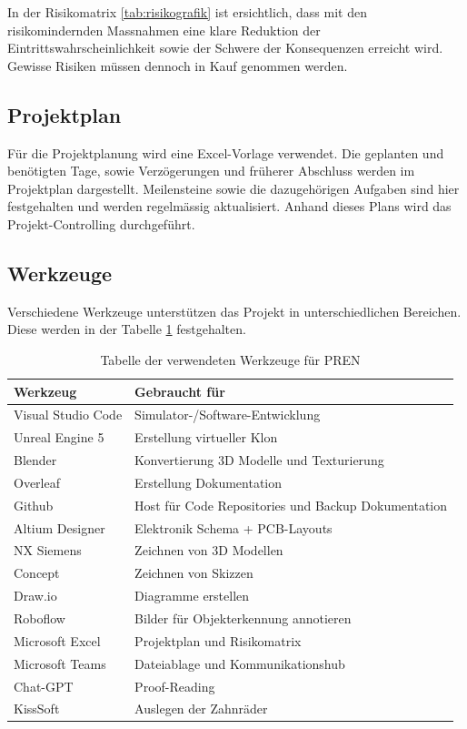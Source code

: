 \documentclass[../main.tex]{subfiles}
\begin{document}
In der Risikomatrix \ref{tab:risikografik} ist ersichtlich, dass mit den risikomindernden Massnahmen eine klare Reduktion der Eintrittswahrscheinlichkeit sowie der Schwere der Konsequenzen erreicht wird. Gewisse Risiken müssen dennoch in Kauf genommen werden.

\subsection{Projektplan}
Für die Projektplanung wird eine Excel-Vorlage verwendet. Die geplanten und benötigten Tage, sowie Verzögerungen und früherer Abschluss werden im Projektplan dargestellt. Meilensteine sowie die dazugehörigen Aufgaben sind hier festgehalten und werden regelmässig aktualisiert. Anhand dieses Plans wird das Projekt-Controlling durchgeführt.


\subsection{Werkzeuge}

Verschiedene Werkzeuge unterstützen das Projekt in unterschiedlichen Bereichen. Diese werden in der Tabelle \ref{tab:werkzeugtabelle} festgehalten.

\begin{table}[H]
\centering
\begin{tabular}{|l|l|}
\hline
\textbf{Werkzeug} & \textbf{Gebraucht für} \\ \hline
Visual Studio Code & Simulator-/Software-Entwicklung \\ \hline
Unreal Engine 5 & Erstellung virtueller Klon \\ \hline
Blender & Konvertierung 3D Modelle und Texturierung \\ \hline
Overleaf & Erstellung Dokumentation \\ \hline
Github & Host für Code Repositories und Backup Dokumentation \\ \hline
Altium Designer & Elektronik Schema + PCB-Layouts \\ \hline
NX Siemens & Zeichnen von 3D Modellen \\ \hline
Concept & Zeichnen von Skizzen \\ \hline
Draw.io & Diagramme erstellen \\ \hline
Roboflow & Bilder für Objekterkennung annotieren \\ \hline
Microsoft Excel & Projektplan und Risikomatrix \\ \hline
Microsoft Teams & Dateiablage und Kommunikationshub \\ \hline
Chat-GPT & Proof-Reading \\ \hline
KissSoft & Auslegen der Zahnräder \\ \hline
 
\end{tabular}
\caption{Tabelle der verwendeten Werkzeuge für PREN}
\label{tab:werkzeugtabelle}
\end{table}
\end{document}
